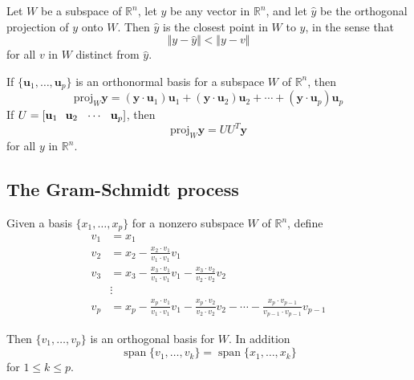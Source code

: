 \documentclass{article}
\DeclareMathOperator{\spn}{span}
\begin{document}
\begin{thm} 
    Let \(W\) be a subspace of \(\mathbb{R}^n\), let \(y\) be any vector in \(\mathbb{R}^n\), and let \(\hat{y}\) be the orthogonal projection of \(y\) onto \(W\). Then \(\hat{y}\) is the closest point in \(W\) to \(y\), in the sense that \[\Vert y-\hat{y} \Vert < \Vert y-v \Vert\] for all \(v\) in \(W\) distinct from \(\hat{y}\).
\end{thm}

\begin{thm} 
    If \(\{\textbf{u}_1,\ldots,\textbf{u}_p\}\) is an orthonormal basis for a subspace \(W\) of \(\mathbb{R}^n\), then \[\text{proj}_{W}\textbf{y}=(\textbf{y}\cdot\textbf{u}_1)\textbf{u}_1+(\textbf{y}\cdot\textbf{u}_2)\textbf{u}_2+\cdots+(\textbf{y}\cdot\textbf{u}_p)\textbf{u}_p\] If \(U=\left[\textbf{u}_1\hspace{.25cm}\textbf{u}_2\hspace{.25cm}\cdots\hspace{.25cm}\textbf{u}_p\right]\), then \[\text{proj}_{W}\textbf{y}=U U^T\textbf{y}\] for all \(y\) in \(\mathbb{R}^n\).
\end{thm}

\subsection{The Gram-Schmidt process}

\begin{thm} 
    Given a basis \(\{x_1,\ldots,x_p\}\) for a nonzero subspace \(W\) of \(\mathbb{R}^n\), define \begin{align*}
    v_1&=x_1\\
    v_2&=x_2-\frac{x_2\cdot v_1}{v_1\cdot v_1}v_1\\
    v_3&=x_3-\frac{x_3\cdot v_1}{v_1\cdot v_1}v_1-\frac{x_3\cdot v_2}{v_2\cdot v_2}v_2\\
    &\vdots\\
    v_p&=x_p-\frac{x_p\cdot v_1}{v_1\cdot v_1}v_1-\frac{x_p\cdot v_2}{v_2\cdot v_2}v_2-\cdots-\frac{x_p\cdot v_{p-1}}{v_{p-1}\cdot v_{p-1}}v_{p-1}
\end{align*}

    Then \(\{v_1,\ldots,v_p\}\) is an orthogonal basis for \(W\). In addition \[\spn\{v_1,\ldots,v_k\}=\spn\{x_1,\ldots,x_k\}\]\hspace{.5cm} for \(1\leq k\leq p\).
\end{thm}
\end{document}
